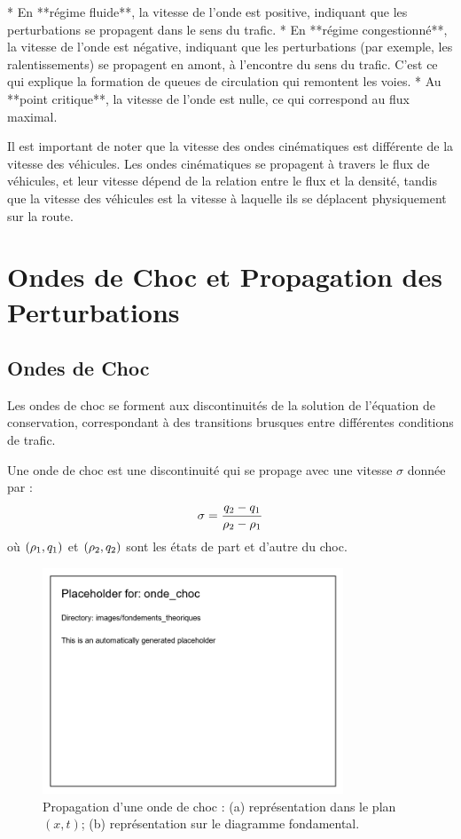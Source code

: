 *   En **régime fluide**, la vitesse de l'onde est positive, indiquant que les perturbations se propagent dans le sens du trafic.
*   En **régime congestionné**, la vitesse de l'onde est négative, indiquant que les perturbations (par exemple, les ralentissements) se propagent en amont, à l'encontre du sens du trafic. C'est ce qui explique la formation de queues de circulation qui remontent les voies.
*   Au **point critique**, la vitesse de l'onde est nulle, ce qui correspond au flux maximal.

Il est important de noter que la vitesse des ondes cinématiques est différente de la vitesse des véhicules. Les ondes cinématiques se propagent à travers le flux de véhicules, et leur vitesse dépend de la relation entre le flux et la densité, tandis que la vitesse des véhicules est la vitesse à laquelle ils se déplacent physiquement sur la route.

\section{Ondes de Choc et Propagation des Perturbations}
\label{sec:onde_choc}

\subsection{Ondes de Choc}
\label{subsec:chocs}

Les ondes de choc se forment aux discontinuités de la solution de l'équation de conservation, correspondant à des transitions brusques entre différentes conditions de trafic.

\begin{definition}
Une onde de choc est une discontinuité qui se propage avec une vitesse $\sigma$ donnée par :
\begin{align}
\sigma = \frac{q_2 - q_1}{\rho_2 - \rho_1}
\label{eq:shock_speed}
\end{align}
où $(\rho_1, q_1)$ et $(\rho_2, q_2)$ sont les états de part et d'autre du choc.
\end{definition}

\begin{figure}[htbp]
\centering
\includegraphics[width=0.8\textwidth]{images/fondements_theoriques/onde_choc}
\caption{Propagation d'une onde de choc : (a) représentation dans le plan $(x,t)$; (b) représentation sur le diagramme fondamental.}
\label{fig:onde_choc}
\end{figure}


